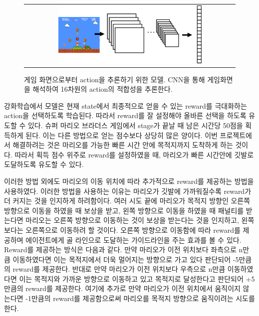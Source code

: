 \begin{figure}[]
\begin{center}
\begin{tabular}{c}
     \includegraphics[width=0.7\textwidth]{FIG/overview.pdf} \\
\end{tabular}
\caption{
	게임 화면으로부터 action을 추론하기 위한 모델. CNN을 통해 게임화면을 해석하여 16차원의 action의 적합성을 추론한다.
}
\label{fig:overview}
\end{center}
\end{figure}

강화학습에서 모델은 현재 state에서 최종적으로 얻을 수 있는 reward를 극대화하는 action을 선택하도록 학습된다.
따라서 reward를 잘 설정해야 올바른 선택을 하도록 유도할 수 있다.
슈퍼 마리오 브라더스 게임에서 stage가 끝날 때 남은 시간당 50점을 획득하게 된다.
이는 다른 방법으로 얻는 점수보다 상당히 많은 양이다.
이번 프로젝트에서 해결하려는 것은 마리오를 가능한 빠른 시간 안에 목적지까지 도착하게 하는 것이다. 
따라서 획득 점수 위주로 reward를 설정하였을 때, 마리오가 빠른 시간안에 깃발로 도달하도록 유도할 수 있다.




이러한 방법 외에도 마리오의 이동 위치에 따라 추가적으로 reward를 제공하는 방법을 사용하였다. 
이러한 방법을 사용하는 이유는 마리오가 깃발에 가까워질수록 reward가 더 커지는 것을 인지하게 하려함이다. 
여러 시도 끝에 마리오가 목적지 방향인 오른쪽 방향으로 이동을 하였을 때 보상을 받고, 왼쪽 방향으로 이동을 하였을 때 패널티를 받는다면 마리오는 오른쪽 방향으로 이동하는 것이 보상을 받는다는 것을 인지하고, 왼쪽보다는 오른쪽으로 이동하려 할 것이다.
오른쪽 방향으로 이동함에 따라 reward를 제공하며 에이전트에게 골 라인으로 도달하는 가이드라인을 주는 효과를 볼 수 있다.
Reward를 제공하는 방식은 다음과 같다.
만약 마리오가 이전 위치보다 좌측으로 n만큼 이동하였다면 이는 목적지에서 더욱 멀어지는 방향으로 가고 있다 판단되어 -5만큼의 reward를 제공한다. 
반대로 만약 마리오가 이전 위치보다 우측으로 n만큼 이동하였다면 이는 목적지와 가까운 방향으로 이동하고 있고 목적지로 달성한다고 판단되어 +5만큼의 reward를 제공한다.
여기에 추가로 만약 마리오가 이전 위치에서 움직이지 않는다면 -1만큼의 reward를 제공함으로써 마리오를 목적지 방향으로 움직이려는 시도를 한다. 

